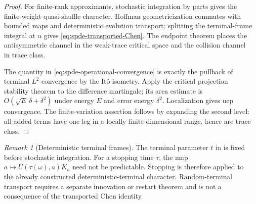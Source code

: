 \documentclass[10pt,reqno]{amsart}
\theoremstyle{plain}
\theoremstyle{definition}
\theoremstyle{remark}
\newtheorem{remark}[theorem]{Remark}
\begin{document}
\begin{proof}
For finite-rank approximants, stochastic integration by parts gives the
finite-weight quasi-shuffle character.  Hoffman geometricization commutes
with bounded maps and deterministic evolution transport; splitting the
terminal-frame integral at $u$ gives
\eqref{eq:spde-transported-Chen}.  The endpoint theorem
 places the antisymmetric channel in
the weak-trace critical space and the collision channel in trace class.

The quantity in \eqref{eq:spde-operational-convergence} is exactly the pullback
of terminal $L^2$ convergence by the It\^o isometry.  Apply the critical
projection stability theorem  to
the difference martingale; its area estimate is
$O(\sqrt E\,\delta+\delta^2)$ under energy $E$ and error energy $\delta^2$.
Localization gives ucp convergence.  The finite-variation assertion follows
by expanding the second level: all added terms have one leg in a locally
finite-dimensional range, hence are trace class.
\end{proof}

\begin{remark}[Deterministic terminal frames]
\label{rem:deterministic-terminal-frame}
The terminal parameter $t$ in  is fixed
before stochastic integration.  For a stopping time $\tau$, the map
$a\mapsto U(\tau(\omega),a)K_a$ need not be predictable.  Stopping is
therefore applied to the already constructed deterministic-terminal
character.  Random-terminal transport requires a separate innovation or
restart theorem and is not a consequence of the transported Chen identity.
\end{remark}
\end{document}
